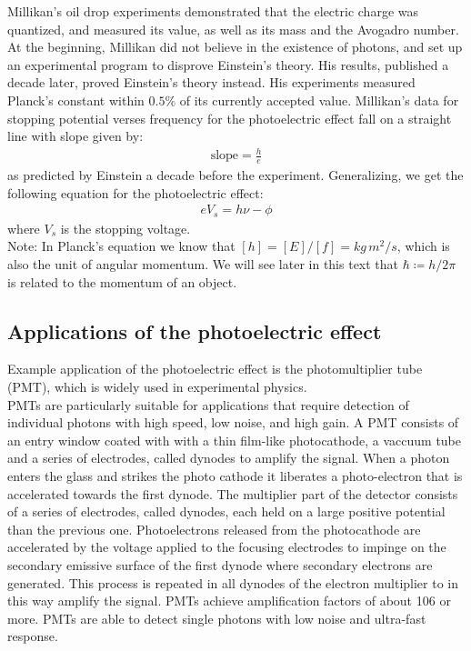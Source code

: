 \documentclass[11pt]{article}
\theoremstyle{break}
\theoremstyle{break}
\newcommand{\note}{\color{red}Note: \color{black}}
\begin{document}
Millikan's oil drop experiments demonstrated that the electric charge was quantized, and measured its value, as well as its mass and the Avogadro number. At the beginning, Millikan did not believe in the existence of photons, and set up an experimental program to disprove Einstein's theory. His results, published a decade later, proved Einstein's theory instead.  His experiments measured Planck's constant within $0.5\%$ of its currently accepted value. Millikan's data for stopping potential verses frequency for the photoelectric effect fall on a straight line with slope given by:
\begin{align*}
\text{slope} = \frac{h}{e}
\end{align*}
as predicted by Einstein a decade before the experiment. Generalizing, we get the following equation for the photoelectric effect:
\begin{align*}
eV_{s} = h\nu - \phi
\end{align*}
where $V_s$ is the stopping voltage. \\


\note In Planck's equation we know that $[h] = [E] / [f] = kg\,m^2 / s$, which is also the unit of angular momentum. We will see later in this text that $\hbar \coloneqq h/2\pi$ is related to the momentum of an object. \\

\subsection{Applications of the photoelectric effect}
Example application of the photoelectric effect is the photomultiplier tube (PMT), which is widely used in experimental physics. \\

PMTs are particularly suitable for applications that require detection of individual photons with high speed, low noise, and high gain. A PMT consists of an entry window coated with with a thin film-like photocathode, a vaccuum tube and a series of electrodes, called dynodes to amplify the signal. When a photon enters the glass and strikes the photo cathode it liberates a photo-electron that is accelerated towards the first dynode. The multiplier part of the detector consists of
a series of electrodes, called dynodes, each held on a large positive potential than the previous one. Photoelectrons released from the photocathode are accelerated by the voltage applied to the focusing electrodes to impinge on the secondary emissive surface of the first dynode where secondary electrons are generated. This process is repeated in all dynodes of the electron multiplier to in this way amplify the signal. PMTs achieve amplification factors of about 106 or more. PMTs
are able to detect single photons with low noise and ultra-fast response.\\
\end{document}
